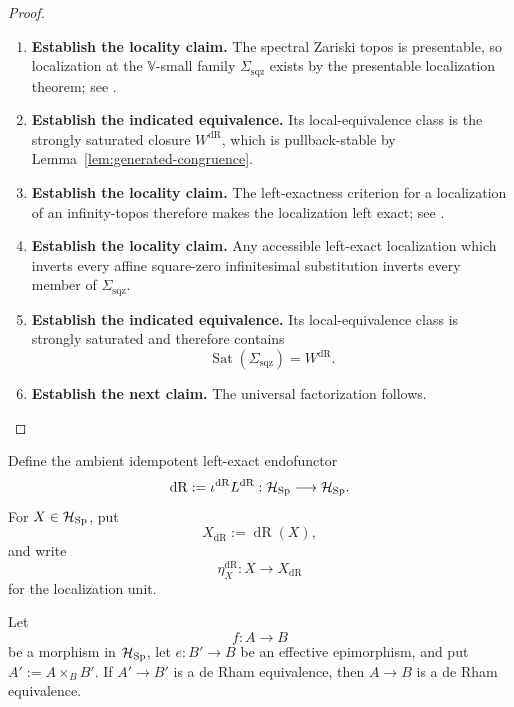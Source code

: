 \begin{proof}
\leavevmode
\begin{enumerate}[label=\textup{(\arabic*)}]
    \item \textbf{Establish the locality claim.}
    The spectral Zariski topos is presentable, so localization at the
    \(\mathbb V\)-small family \(\Sigma_{\mathrm{sqz}}\) exists by the presentable
    localization theorem;
    see \cite[Proposition~5.5.4.15]{LurieHigherToposTheory}.
    \item \textbf{Establish the indicated equivalence.}
    Its local-equivalence
    class is the strongly saturated closure \(W^{\mathrm{dR}}\), which is
    pullback-stable by Lemma~\ref{lem:generated-congruence}.
    \item \textbf{Establish the locality claim.}
    The left-exactness
    criterion for a localization of an infinity-topos therefore makes the localization
    left exact; see \cite[Proposition~6.2.1.1]{LurieHigherToposTheory}.
    \item \textbf{Establish the locality claim.}
    Any accessible left-exact localization which inverts every affine square-zero
    infinitesimal substitution inverts every member of
    \(\Sigma_{\mathrm{sqz}}\).
    \item \textbf{Establish the indicated equivalence.}
    Its local-equivalence class is strongly saturated and
    therefore contains
    \[
    \operatorname{Sat}(\Sigma_{\mathrm{sqz}})
    =
    W^{\mathrm{dR}}.
    \]
    \item \textbf{Establish the next claim.}
    The universal factorization follows.
\end{enumerate}
\end{proof}

\begin{definition}
Define the ambient idempotent left-exact endofunctor
\[
  \operatorname{dR}
  :=
  \iota^{\mathrm{dR}}L^{\mathrm{dR}}:
  \mathcal H_{\operatorname{Sp}}\longrightarrow\mathcal H_{\operatorname{Sp}}.
\]
For \(X\in\mathcal H_{\operatorname{Sp}}\), put
\[
  X_{\mathrm{dR}}:=\operatorname{dR}(X),
\]
and write
\[
  \eta_X^{\mathrm{dR}}:X\longrightarrow X_{\mathrm{dR}}
\]
for the localization unit.
\end{definition}

\begin{lemma}
\label{lem:absolute-target-descent-de-Rham}
Let
\[
  f:A\longrightarrow B
\]
be a morphism in \(\mathcal H_{\operatorname{Sp}}\), let
\(e:B'\to B\) be an effective epimorphism, and put
\(A':=A\times_BB'\). If \(A'\to B'\) is a de Rham equivalence, then
\(A\to B\) is a de Rham equivalence.
\end{lemma}

